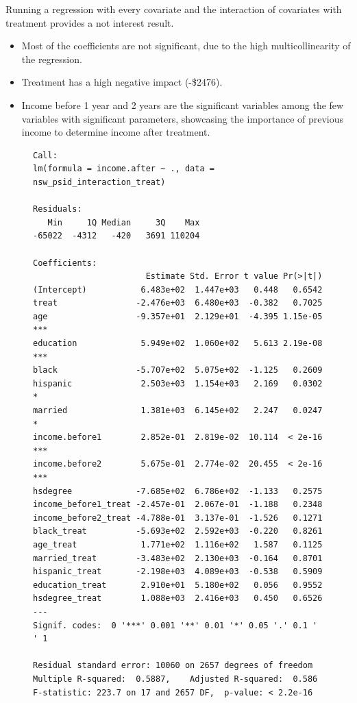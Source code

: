 \documentclass{article}
\begin{document}
Running a regression with every covariate and the interaction of covariates with treatment provides a not interest result.

\begin{itemize}
    \item Most of the coefficients are not significant, due to the high multicollinearity of the regression.
    \item Treatment has a high negative impact (-\$2476).
    \item Income before 1 year and 2 years are the significant variables among the few variables with significant parameters, showcasing the importance of previous income to determine income after treatment.
\end{itemize}

\begin{figure}[H]
\centering
\begin{lstlisting}[style=Rstyle, caption=Model with Interactions]
Call:
lm(formula = income.after ~ ., data = nsw_psid_interaction_treat)

Residuals:
   Min     1Q Median     3Q    Max 
-65022  -4312   -420   3691 110204 

Coefficients:
                       Estimate Std. Error t value Pr(>|t|)    
(Intercept)           6.483e+02  1.447e+03   0.448   0.6542    
treat                -2.476e+03  6.480e+03  -0.382   0.7025    
age                  -9.357e+01  2.129e+01  -4.395 1.15e-05 ***
education             5.949e+02  1.060e+02   5.613 2.19e-08 ***
black                -5.707e+02  5.075e+02  -1.125   0.2609    
hispanic              2.503e+03  1.154e+03   2.169   0.0302 *  
married               1.381e+03  6.145e+02   2.247   0.0247 *  
income.before1        2.852e-01  2.819e-02  10.114  < 2e-16 ***
income.before2        5.675e-01  2.774e-02  20.455  < 2e-16 ***
hsdegree             -7.685e+02  6.786e+02  -1.133   0.2575    
income_before1_treat -2.457e-01  2.067e-01  -1.188   0.2348    
income_before2_treat -4.788e-01  3.137e-01  -1.526   0.1271    
black_treat          -5.693e+02  2.592e+03  -0.220   0.8261    
age_treat             1.771e+02  1.116e+02   1.587   0.1125    
married_treat        -3.483e+02  2.130e+03  -0.164   0.8701    
hispanic_treat       -2.198e+03  4.089e+03  -0.538   0.5909    
education_treat       2.910e+01  5.180e+02   0.056   0.9552    
hsdegree_treat        1.088e+03  2.416e+03   0.450   0.6526    
---
Signif. codes:  0 '***' 0.001 '**' 0.01 '*' 0.05 '.' 0.1 ' ' 1

Residual standard error: 10060 on 2657 degrees of freedom
Multiple R-squared:  0.5887,	Adjusted R-squared:  0.586 
F-statistic: 223.7 on 17 and 2657 DF,  p-value: < 2.2e-16
\end{lstlisting}
\end{figure}
\end{document}
